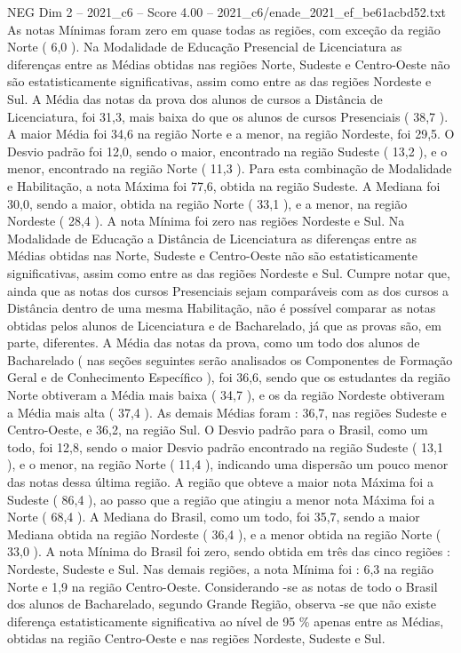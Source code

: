 \begin{textsample}{NEG Dim 2 – 2021\_c6 – Score 4.00 – 2021\_c6/enade\_2021\_ef\_be61acbd52.txt}
As notas Mínimas foram zero em quase todas as regiões, com exceção da região Norte ( 6,0 ).
Na Modalidade de Educação Presencial de Licenciatura as diferenças entre as Médias obtidas nas regiões Norte, Sudeste e Centro-Oeste não são estatisticamente significativas, assim como entre as das regiões Nordeste e Sul.
A Média das notas da prova dos alunos de cursos a Distância de Licenciatura, foi 31,3, mais baixa do que os alunos de cursos Presenciais ( 38,7 ).
A maior Média foi 34,6 na região Norte e a menor, na região Nordeste, foi 29,5.
O Desvio padrão foi 12,0, sendo o maior, encontrado na região Sudeste ( 13,2 ), e o menor, encontrado na região Norte ( 11,3 ).
Para esta combinação de Modalidade e Habilitação, a nota Máxima foi 77,6, obtida na região Sudeste.
A Mediana foi 30,0, sendo a maior, obtida na região Norte ( 33,1 ), e a menor, na região Nordeste ( 28,4 ).
A nota Mínima foi zero nas regiões Nordeste e Sul.
Na Modalidade de Educação a Distância de Licenciatura as diferenças entre as Médias obtidas nas Norte, Sudeste e Centro-Oeste não são estatisticamente significativas, assim como entre as das regiões Nordeste e Sul.
Cumpre notar que, ainda que as notas dos cursos Presenciais sejam comparáveis com as dos cursos a Distância dentro de uma mesma Habilitação, não é possível comparar as notas obtidas pelos alunos de Licenciatura e de Bacharelado, já que as provas são, em parte, diferentes.
A Média das notas da prova, como um todo dos alunos de Bacharelado ( nas seções seguintes serão analisados os Componentes de Formação Geral e de Conhecimento Específico ), foi 36,6, sendo que os estudantes da região Norte obtiveram a Média mais baixa ( 34,7 ), e os da região Nordeste obtiveram a Média mais alta ( 37,4 ).
As demais Médias foram : 36,7, nas regiões Sudeste e Centro-Oeste, e 36,2, na região Sul.
O Desvio padrão para o Brasil, como um todo, foi 12,8, sendo o maior Desvio padrão encontrado na região Sudeste ( 13,1 ), e o menor, na região Norte ( 11,4 ), indicando uma dispersão um pouco menor das notas dessa última região.
A região que obteve a maior nota Máxima foi a Sudeste ( 86,4 ), ao passo que a região que atingiu a menor nota Máxima foi a Norte ( 68,4 ).
A Mediana do Brasil, como um todo, foi 35,7, sendo a maior Mediana obtida na região Nordeste ( 36,4 ), e a menor obtida na região Norte ( 33,0 ).
A nota Mínima do Brasil foi zero, sendo obtida em três das cinco regiões : Nordeste, Sudeste e Sul.
Nas demais regiões, a nota Mínima foi : 6,3 na região Norte e 1,9 na região Centro-Oeste.
Considerando -se as notas de todo o Brasil dos alunos de Bacharelado, segundo Grande Região, observa -se que não existe diferença estatisticamente significativa ao nível de 95 \% apenas entre as Médias, obtidas na região Centro-Oeste e nas regiões Nordeste, Sudeste e Sul.

\end{textsample}
